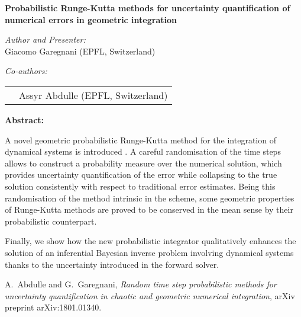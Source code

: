 \documentclass{article}
\begin{document}
\begin{center}
{\bf Probabilistic Runge-Kutta methods for uncertainty quantification of numerical errors in geometric integration}
\end{center}


\begin{center}
{\it Author and Presenter:} \\[0.5ex]
Giacomo Garegnani (EPFL, Switzerland)
\end{center}

\begin{center}
{\it Co-authors:}\\[0.5ex]
\begin{tabular}{ll}
& Assyr Abdulle (EPFL, Switzerland)\\
\end{tabular}
\end{center}

\bigskip\noindent

{\bf Abstract:} 

A novel geometric probabilistic Runge-Kutta method for the integration of dynamical systems is introduced \cite{AbG18}. A careful randomisation of the time steps allows to construct a probability measure over the numerical solution, which provides uncertainty quantification of the error while collapsing to the true solution consistently with respect to traditional error estimates. Being this randomisation of the method intrinsic in the scheme, some geometric properties of Runge-Kutta methods are proved to be conserved in the mean sense by their probabilistic counterpart.

Finally, we show how the new probabilistic integrator qualitatively enhances the solution of an inferential Bayesian inverse problem involving dynamical systems thanks to the uncertainty introduced in the forward solver.

\bigskip\noindent

\begin{thebibliography}{1}
{\sc A.~Abdulle and G.~Garegnani}, {\em Random time step probabilistic methods
	for uncertainty quantification in chaotic and geometric numerical
	integration}, arXiv preprint arXiv:1801.01340.
\end{thebibliography}
\end{document}
